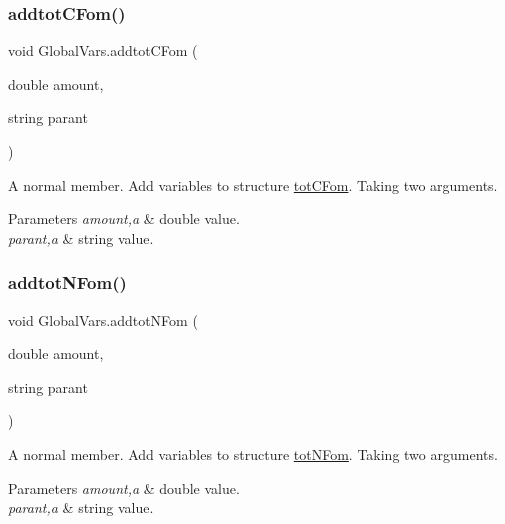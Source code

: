 \subsubsection{\texorpdfstring{addtotCFom()}{addtotCFom()}}
{\footnotesize\ttfamily void Global\+Vars.\+addtot\+C\+Fom (\begin{DoxyParamCaption}\item[{double}]{amount,  }\item[{string}]{parant }\end{DoxyParamCaption})\hspace{0.3cm}{\ttfamily [inline]}}



A normal member. Add variables to structure \mbox{\hyperlink{struct_global_vars_1_1tot_c_fom}{tot\+C\+Fom}}. Taking two arguments. 


\begin{DoxyParams}{Parameters}
{\em amount,a} & double value. \\
\hline
{\em parant,a} & string value. \\
\hline
\end{DoxyParams}
\mbox{\label{class_global_vars_a33070ef9c825f07e71cab9822692abf4}} 
\subsubsection{\texorpdfstring{addtotNFom()}{addtotNFom()}}
{\footnotesize\ttfamily void Global\+Vars.\+addtot\+N\+Fom (\begin{DoxyParamCaption}\item[{double}]{amount,  }\item[{string}]{parant }\end{DoxyParamCaption})\hspace{0.3cm}{\ttfamily [inline]}}



A normal member. Add variables to structure \mbox{\hyperlink{struct_global_vars_1_1tot_n_fom}{tot\+N\+Fom}}. Taking two arguments. 


\begin{DoxyParams}{Parameters}
{\em amount,a} & double value. \\
\hline
{\em parant,a} & string value. \\
\hline
\end{DoxyParams}
\mbox{\label{class_global_vars_ae96481c7f7db5cf25742d29ced57b3c0}} 
